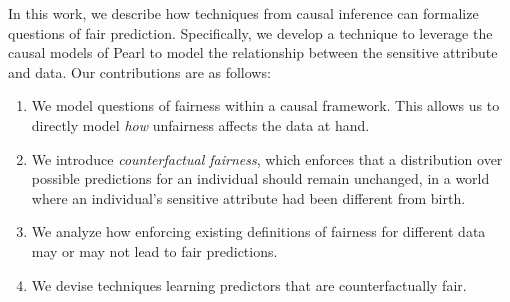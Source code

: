 % 

In this work, we describe how techniques from causal inference can formalize questions of fair prediction. Specifically, we
develop a technique to leverage the causal models of Pearl
\cite{pearl2009causal} to model the relationship between the sensitive
attribute and data. Our contributions are as follows:
\begin{enumerate}
    \item We model questions of fairness within a causal framework. This allows us to directly model \emph{how} unfairness affects the data at hand.
    \item We introduce \emph{counterfactual fairness}, which enforces that a distribution over possible predictions for an individual should remain unchanged, in a world where an individual's sensitive attribute had been different from birth.
    \item We analyze how enforcing existing definitions of fairness for different data may or may not lead to fair predictions.
    \item We devise techniques learning predictors that are counterfactually fair.
\end{enumerate}













